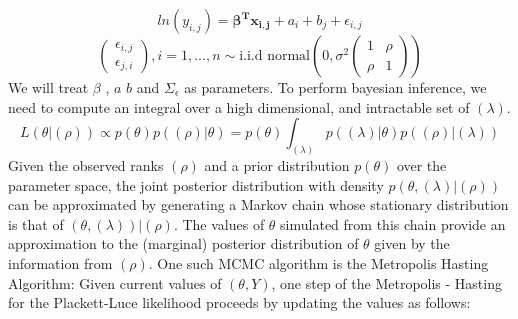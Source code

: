 \documentclass[12pt]{ociamthesis}  %
\begin{document}
	\begin{equation}
	ln(y_{i,j}) = \boldsymbol{\beta^{T} {x_{i,j}}} + a_{i} + b_{j} + \epsilon_{i,j}
	\end{equation}
	\begin{equation}
	\begin{pmatrix}
	\epsilon_{i,j} \\
	\epsilon_{j,i}
	\end{pmatrix}
	, i = 1,...,n \sim \text{i.i.d normal}(0,\sigma^{2} \begin{pmatrix} 1 & \rho \\ \rho & 1 \end{pmatrix})
	\end{equation}
	We will treat \boldmath $\beta$ \unboldmath, \boldmath $a$ \unboldmath \boldmath $b$ \unboldmath and $\Sigma_{\epsilon}$ as parameters. \newline
	To perform bayesian inference, we need to compute an integral over a high dimensional, and intractable set of $(\lambda)$.
	\begin{equation}
		L(\theta | (\rho)) \propto p(\theta)p((\rho) | \theta) = p(\theta)\int_{(\lambda)}p((\lambda) | \theta)p((\rho) | (\lambda))
	\end{equation}
	Given the observed ranks $(\rho)$ and a prior distribution $p(\theta)$ over the parameter space, the joint posterior distribution with density $p(\theta, (\lambda)|(\rho))$ can be approximated by generating a Markov chain whose stationary distribution is that of $(\theta, (\lambda)) | (\rho)$. The values of $\theta$ simulated from this chain provide an approximation to the (marginal) posterior distribution of $\theta$ given by the information from $(\rho)$. \newline
	One such MCMC algorithm is the Metropolis Hasting Algorithm: \newline
	Given current values of $(\theta, Y)$, one step of the Metropolis - Hasting for the Plackett-Luce likelihood proceeds by updating the values as follows:
\end{document}
